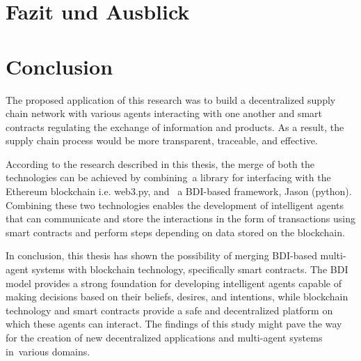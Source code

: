 {\chapter{Fazit und Ausblick}}
{\chapter{Conclusion}}

\label{sec:conclusion}

The proposed application of this research was to build a decentralized supply chain network with various agents interacting with one another and smart contracts regulating the exchange of information and products. As a result, the supply chain process would be more transparent, traceable, and effective. 

\vspace{.5cm}

According to the research described in this thesis, the merge of both the technologies can be achieved by combining a library for interfacing with the Ethereum blockchain i.e. web3.py, and  a \ac{BDI}-based framework, Jason (python). Combining these two technologies enables the development of intelligent agents that can communicate and store the interactions in the form of transactions using smart contracts and perform steps depending on data stored on the blockchain.

\vspace{.5cm}

In conclusion, this thesis has shown the possibility of merging \ac{BDI}-based multi-agent systems with blockchain technology, specifically smart contracts. The \ac{BDI} model provides a strong foundation for developing intelligent agents capable of making decisions based on their beliefs, desires, and intentions, while blockchain technology and smart contracts provide a safe and decentralized platform on which these agents can interact. The findings of this study might pave the way for the creation of new decentralized applications and multi-agent systems in various domains.


